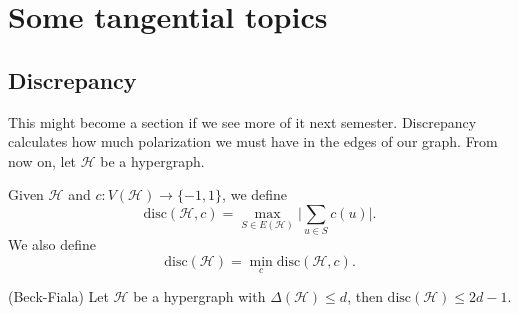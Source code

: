 \section{Some tangential topics}

\subsection{Discrepancy}
This might become a section if we see more of it next semester.
Discrepancy calculates how much polarization we
must have in the edges of our graph. From now on, let $\mathcal{H}$
be a hypergraph.

\begin{definition}
	Given $\mathcal{H}$ and $c : V(\mathcal{H}) \to \{-1,1\}$, we define
	\[
		\text{disc}(\mathcal{H},c) = \max_{S \in E(\mathcal{H})}
		\bigg|\sum_{u \in S} c(u)\bigg|.
	\]
	We also define
	\[
		\text{disc}(\mathcal{H}) = \min_{c} \text{disc}(\mathcal{H},c).
	\]
\end{definition}

\begin{theorem}
	(Beck-Fiala) Let $\mathcal{H}$ be a hypergraph with
	$\Delta(\mathcal{H}) \leq d$, then $\text{disc}(\mathcal{H}) \leq 2d - 1$.
\end{theorem}
